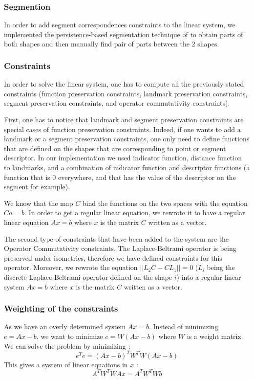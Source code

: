 \documentclass[10pt,twocolumn,letterpaper]{article}
\begin{document}
\subsubsection*{Segmention} %
In order to add segment correspondences constraints to the linear system, we implemented the persistence-based segmentation technique of \cite{Skraba} to obtain parts of both shapes and then manually find pair of parts between the 2 shapes.
\subsubsection*{Constraints} %
In order to solve the linear system, one has to compute all the previously stated constraints (function preservation constraints, landmark preservation constraints, segment preservation constraints, and operator commutativity constraints). 

First, one has to notice that landmark and segment preservation constraints are special cases of function preservation constraints. Indeed, if one wants to add a landmark or a segment preservation constraints, one only need to define functions that are defined on the shapes that are corresponding to point or segment descriptor. In our implementation we used indicator function, distance function to landmarks, and a combination of indicator function and descriptor functions (a function that is $0$ everywhere, and that has the value of the descriptor on the segment for example). 

We know that the map $C$ bind the functions on the two spaces with the equation $Ca = b$. In order to get a regular linear equation, we rewrote it to have a regular linear equation $Ax = b$ where $x$ is the matrix $C$ written as a vector.

The second type of constraints that have been added to the system are the Operator Commutativity constraints. The Laplace-Beltrami operator is being preserved under isometries, therefore we have defined constraints for this operator. Moreover, we rewrote the equation $||L_{2}C - CL_{1}|| = 0$ ($L_{i}$ being the discrete Laplace-Beltrami operator defined on the shape $i$) into a regular linear system $Ax = b$ where $x$ is the matrix $C$ written as a vector. 

\subsubsection*{Weighting of the constraints}
As we have an overly determined system $Ax = b$. Instead of minimizing $e = Ax-b$, we want to minimize $e = W(Ax-b)$ where $W$ is a weight matrix. We can solve the problem by minimizing :
\begin{equation}
e^{T}e = (Ax-b)^{T}W^{T}W(Ax-b)
\end{equation}
This gives a system of linear equations in $x$ :
\begin{equation}
A^{T}W^{T}WAx = A^{T}W^{T}Wb
\end{equation}
\end{document}
